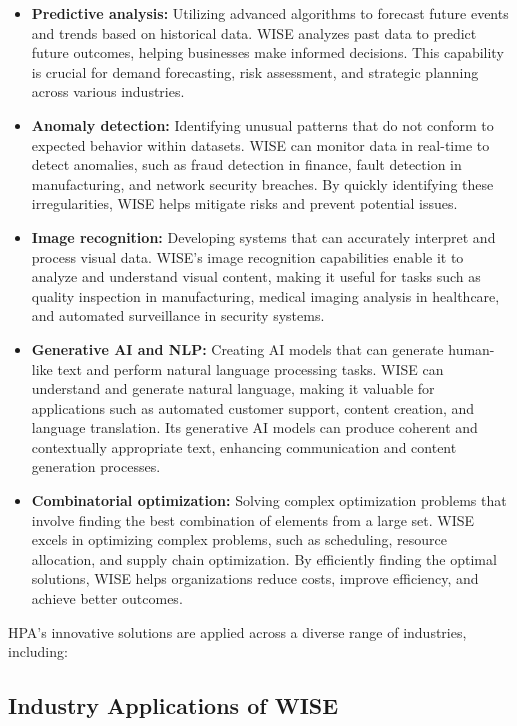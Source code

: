 \begin{itemize}
    \item \textbf{Predictive analysis:} Utilizing advanced algorithms to forecast future events and trends based on historical data. WISE analyzes past data to predict future outcomes, helping businesses make informed decisions. This capability is crucial for demand forecasting, risk assessment, and strategic planning across various industries.

    \item \textbf{Anomaly detection:} Identifying unusual patterns that do not conform to expected behavior within datasets. WISE can monitor data in real-time to detect anomalies, such as fraud detection in finance, fault detection in manufacturing, and network security breaches. By quickly identifying these irregularities, WISE helps mitigate risks and prevent potential issues.

    \item \textbf{Image recognition:} Developing systems that can accurately interpret and process visual data. WISE's image recognition capabilities enable it to analyze and understand visual content, making it useful for tasks such as quality inspection in manufacturing, medical imaging analysis in healthcare, and automated surveillance in security systems.

    \item \textbf{Generative AI and NLP:} Creating AI models that can generate human-like text and perform natural language processing tasks. WISE can understand and generate natural language, making it valuable for applications such as automated customer support, content creation, and language translation. Its generative AI models can produce coherent and contextually appropriate text, enhancing communication and content generation processes.

    \item \textbf{Combinatorial optimization:} Solving complex optimization problems that involve finding the best combination of elements from a large set. WISE excels in optimizing complex problems, such as scheduling, resource allocation, and supply chain optimization. By efficiently finding the optimal solutions, WISE helps organizations reduce costs, improve efficiency, and achieve better outcomes.
\end{itemize}

HPA's innovative solutions are applied across a diverse range of industries, including:

\subsection{Industry Applications of WISE}

